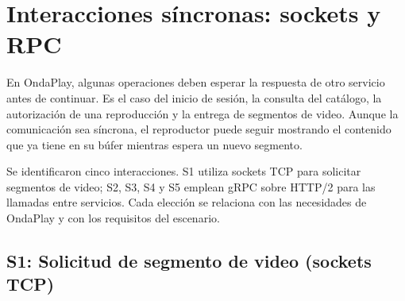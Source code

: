 \section{Interacciones síncronas: sockets y RPC}
\label{sec:sincronas}

En OndaPlay, algunas operaciones deben esperar la respuesta de otro servicio antes de continuar. Es el caso del inicio de sesión, la consulta del catálogo, la autorización de una reproducción y la entrega de segmentos de video. Aunque la comunicación sea síncrona, el reproductor puede seguir mostrando el contenido que ya tiene en su búfer mientras espera un nuevo segmento.

Se identificaron cinco interacciones. S1 utiliza sockets TCP para solicitar segmentos de video; S2, S3, S4 y S5 emplean gRPC sobre HTTP/2 para las llamadas entre servicios. Cada elección se relaciona con las necesidades de OndaPlay y con los requisitos del escenario.

\subsection{S1: Solicitud de segmento de video (sockets TCP)}
\label{sub:s1}

